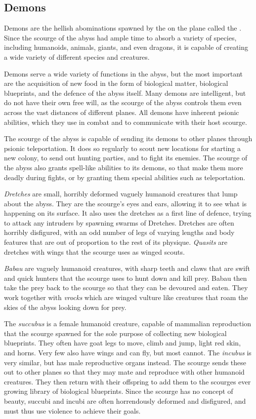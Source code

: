 \subsection{Demons}
\label{sec:Demons}

Demons are the hellish abominations spawned by the  on
the plane called the . Since the scourge of the abyss had
ample time to absorb a variety of species, including humanoids, animals, giants,
and even dragons, it is capable of creating a wide variety of different species
and creatures.

Demons serve a wide variety of functions in the abyss, but the most important
are the acquisition of new food in the form of biological matter, biological
blueprints, and the defence of the abyss itself. Many demons are intelligent,
but do not have their own free will, as the scourge of the abyss controls them
even across the vast distances of different planes. All demons have inherent
psionic abilities, which they use in combat and to communicate with their host
scourge.

The scourge of the abyss is capable of sending its demons to other planes
through psionic teleportation. It does so regularly to scout new locations for
starting a new colony, to send out hunting parties, and to fight its enemies.
The scourge of the abyss also grants spell-like abilities to its demons, so
that make them more deadly during fights, or by granting them special
abilities such as teleportation.

\emph{Dretches} are small, horribly deformed vaguely humanoid creatures that
lump about the abyss. They are the scourge's eyes and ears, allowing it to
see what is happening on its surface. It also uses the dretches as a first
line of defence, trying to attack any intruders by spawning swarms of
Dretches. Dretches are often horribly disfigured, with an odd number of legs
of varying lengths and body features that are out of proportion to the rest of
its physique. \emph{Quasits} are dretches with wings that the scourge uses as
winged scouts.

\emph{Babau} are vaguely humanoid creatures, with sharp teeth and claws that
are swift and quick hunters that the scourge uses to hunt down and kill
prey. Babau then take the prey back to the scourge so that they can be
devoured and eaten. They work together with \emph{vrocks} which are winged
vulture like creatures that roam the skies of the abyss looking down for prey.

The \emph{succubus} is a female humanoid creature, capable of mammalian
reproduction that the scourge spawned for the sole purpose of collecting new
biological blueprints. They often have goat legs to move, climb and jump,
light red skin, and horns. Very few also have wings and can fly, but most
cannot. The \emph{incubus} is very similar, but has male reproductive organs
instead. The scourge sends these out to other planes so that they may mate and
reproduce with other humanoid creatures. They then return with their offspring
to add them to the scourges ever growing library of biological
blueprints. Since the scourge has no concept of beauty, succubi and incubi are
often horrendously deformed and disfigured, and must thus use violence to
achieve their goals.

